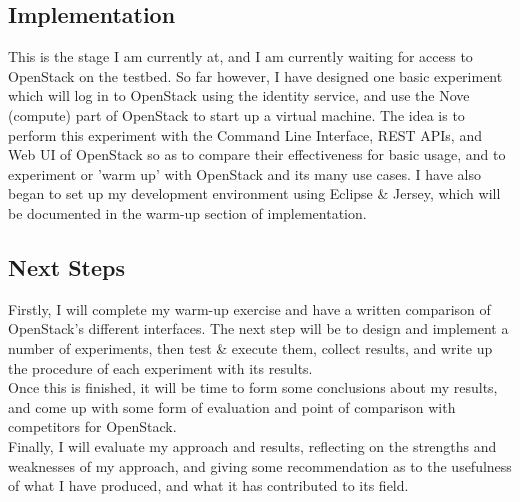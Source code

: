 \subsection{Implementation}

This is the stage I am currently at, and I am currently waiting for access to OpenStack on the testbed. So far however, I have designed one basic experiment which will log in to OpenStack using the identity service, and use the Nove (compute) part of OpenStack to start up a virtual machine. The idea is to perform this experiment with the Command Line Interface, REST APIs, and Web UI of OpenStack so as to compare their effectiveness for basic usage, and to experiment or 'warm up' with OpenStack and its many use cases. I have also began to set up my development environment using Eclipse \& Jersey, which will be documented in the warm-up section of implementation.

\subsection{Next Steps}

Firstly, I will complete my warm-up exercise and have a written comparison of OpenStack's different interfaces. The next step will be to design and implement a number of experiments, then test \& execute them, collect results, and write up the procedure of each experiment with its results. \\
Once this is finished, it will be time to form some conclusions about my results, and come up with some form of evaluation and point of comparison with competitors for OpenStack. \\
Finally, I will evaluate my approach and results, reflecting on the strengths and weaknesses of my approach, and giving some recommendation as to the usefulness of what I have produced, and what it has contributed to its field. 
